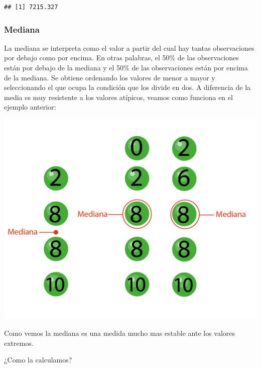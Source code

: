 \documentclass[
]{book}
\newenvironment{Shaded}{\begin{snugshade}}{\end{snugshade}}
\newcommand{\AttributeTok}[1]{\textcolor[rgb]{0.77,0.63,0.00}{#1}}
\newcommand{\ConstantTok}[1]{\textcolor[rgb]{0.00,0.00,0.00}{#1}}
\newcommand{\FunctionTok}[1]{\textcolor[rgb]{0.00,0.00,0.00}{#1}}
\newcommand{\NormalTok}[1]{#1}
\newcommand{\SpecialCharTok}[1]{\textcolor[rgb]{0.00,0.00,0.00}{#1}}
\begin{document}
\begin{verbatim}
## [1] 7215.327
\end{verbatim}

\hypertarget{mediana}{%
\subsubsection{Mediana}\label{mediana}}

La mediana se interpreta como el valor a partir del cual hay tantas observaciones por debajo como por encima. En otras palabras, el 50\% de las observaciones están por debajo de la mediana y el 50\% de las observaciones están por encima de la mediana.
Se obtiene ordenando los valores de menor a mayor y seleccionando el que ocupa la condición que los divide en dos. A diferencia de la media es muy resistente a los valores atípicos, veamos como funciona en el ejemplo anterior:

\includegraphics[width=20.83in]{img/median-01}

Como vemos la mediana es una medida mucho mas estable ante los valores extremos.

¿Como la calculamos?

\begin{Shaded}
\end{Shaded}
\end{document}
